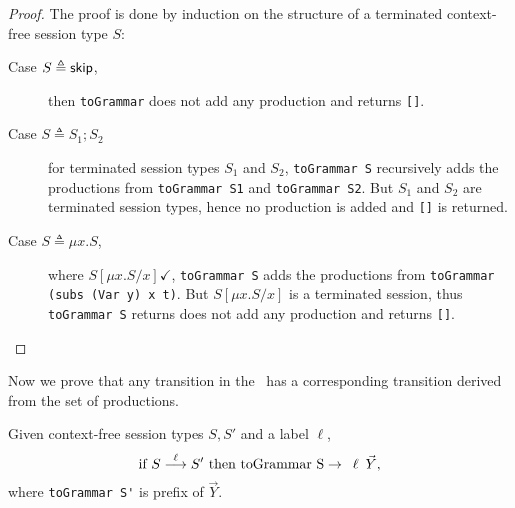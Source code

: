 \begin{proof}
	The proof is done by induction on the structure of a terminated
	context-free session type $S$:
	\begin{description}
		\item[Case $S\triangleq \mathsf{skip}$,] then \lstinline{toGrammar} does not 
		add any production and returns \lstinline{[]}.
		\item[Case $S\triangleq S_1;S_2$] for terminated session types $S_1$ and
		$S_2$, \lstinline{toGrammar S} recursively adds the productions from 
		\lstinline{toGrammar S1} and \lstinline{toGrammar S2}. But $S_1$ and 
		$S_2$ are terminated session types, hence no production is added and
		\lstinline{[]} is returned.
		\item[Case $S\triangleq \mu x. S$,] where $S[\mu x.S/x] \checkmark$,
		\lstinline{toGrammar S} adds the productions from \linebreak
		\lstinline{toGrammar (subs (Var y) x t)}. But $S[\mu x.S/x]$ is a terminated
		session, thus \lstinline{toGrammar S} returns does not add 
		any production and returns \lstinline{[]}.
	\end{description}
\end{proof}

Now we prove that any transition in the \LTS\ has a 
corresponding transition derived from the set of productions.

\begin{lemma}
Given context-free session types $S,S'$ and a label $\ell$,
	\[ \text{if } S \LTSderives[\ell] S' \text{ then } 
	\text{\lstinline{toGrammar S}} \rightarrow \enspace 
	\ell \enspace \vec Y, \]
	where \lstinline{toGrammar S'} is prefix of $\vec Y$.
\end{lemma}

